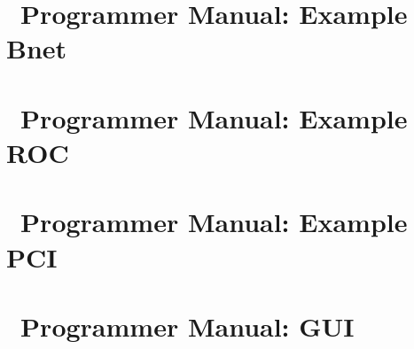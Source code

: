 \chapter[DABC Programmer Manual: Example Bnet]{\dabc\ Programmer Manual: Example Bnet}
 \cleardoublepage
\chapter[DABC Programmer Manual: Example ROC]{\dabc\ Programmer Manual: Example ROC}
 \cleardoublepage
\chapter[DABC Programmer Manual: Example PCI]{\dabc\ Programmer Manual: Example PCI}
 \cleardoublepage
\chapter[DABC Programmer Manual: GUI]{\dabc\ Programmer Manual: GUI}
 \cleardoublepage
